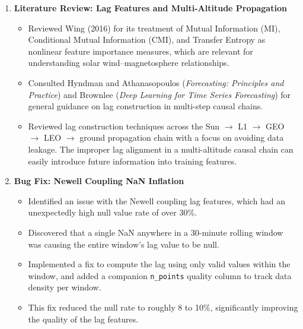 \documentclass{article}
\begin{document}
\begin{enumerate}
  \item \textbf{Literature Review: Lag Features and Multi-Altitude Propagation}
  \begin{itemize}
    \item Reviewed Wing (2016) for its treatment of Mutual Information (MI), Conditional Mutual Information (CMI), and Transfer Entropy as nonlinear feature importance measures, which are relevant for understanding solar wind--magnetosphere relationships.
    \item Consulted Hyndman and Athanasopoulos (\textit{Forecasting: Principles and Practice}) and Brownlee (\textit{Deep Learning for Time Series Forecasting}) for general guidance on lag construction in multi-step causal chains.
    \item Reviewed lag construction techniques across the Sun $\rightarrow$ L1 $\rightarrow$ GEO $\rightarrow$ LEO $\rightarrow$ ground propagation chain with a focus on avoiding data leakage. The improper lag alignment in a multi-altitude causal chain can easily introduce future information into training features.
  \end{itemize}

  \item \textbf{Bug Fix: Newell Coupling NaN Inflation}
  \begin{itemize}
    \item Identified an issue with the Newell coupling lag features, which had an unexpectedly high null value rate of over 30\%.
    \item Discovered that a single NaN anywhere in a 30-minute rolling window was causing the entire window's lag value to be null.
    \item Implemented a fix to compute the lag using only valid values within the window, and added a companion \texttt{n\_points} quality column to track data density per window.
    \item This fix reduced the null rate to roughly 8 to 10\%, significantly improving the quality of the lag features.
  \end{itemize}

\end{enumerate}
\end{document}
